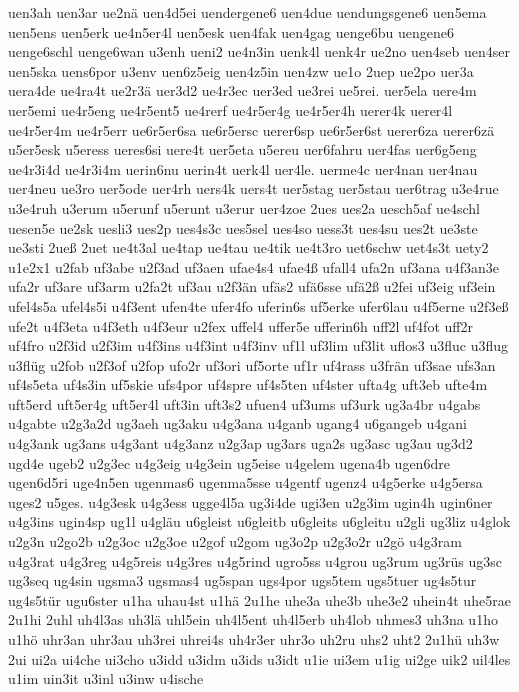{uen3ah
uen3ar
ue2nä
uen4d5ei
uendergene6
uen4due
uendungsgene6
uen5ema
uen5ens
uen5erk
ue4n5er4l
uen5esk
uen4fak
uen4gag
uenge6bu
uengene6
uenge6schl
uenge6wan
u3enh
ueni2
ue4n3in
uenk4l
uenk4r
ue2no
uen4seb
uen4ser
uen5ska
uens6por
u3env
uen6z5eig
uen4z5in
uen4zw
ue1o
2uep
ue2po
uer3a
uera4de
ue4ra4t
ue2r3ä
uer3d2
ue4r3ec
uer3ed
ue3rei
ue5rei.
uer5ela
uere4m
uer5emi
ue4r5eng
ue4r5ent5
ue4rerf
ue4r5er4g
ue4r5er4h
uerer4k
uerer4l
ue4r5er4m
ue4r5err
ue6r5er6sa
ue6r5ersc
uerer6sp
ue6r5er6st
uerer6za
uerer6zä
u5er5esk
u5eress
ueres6si
uere4t
uer5eta
u5ereu
uer6fahru
uer4fas
uer6g5eng
ue4r3i4d
ue4r3i4m
uerin6nu
uerin4t
uerk4l
uer4le.
uerme4c
uer4nan
uer4nau
uer4neu
ue3ro
uer5ode
uer4rh
uers4k
uers4t
uer5stag
uer5stau
uer6trag
u3e4rue
u3e4ruh
u3erum
u5erunf
u5erunt
u3erur
uer4zoe
2ues
ues2a
uesch5af
ue4schl
uesen5e
ue2sk
uesli3
ues2p
ues4s3c
ues5sel
ues4so
uess3t
ues4su
ues2t
ue3ste
ue3sti
2ueß
2uet
ue4t3al
ue4tap
ue4tau
ue4tik
ue4t3ro
uet6schw
uet4s3t
uety2
u1e2x1
u2fab
uf3abe
u2f3ad
uf3aen
ufae4s4
ufae4ß
ufall4
ufa2n
uf3ana
u4f3an3e
ufa2r
uf3are
uf3arm
u2fa2t
uf3au
u2f3än
ufäs2
ufä6sse
ufä2ß
u2fei
uf3eig
uf3ein
ufel4s5a
ufel4s5i
u4f3ent
ufen4te
ufer4fo
uferin6s
uf5erke
ufer6lau
u4f5erne
u2f3eß
ufe2t
u4f3eta
u4f3eth
u4f3eur
u2fex
uffel4
uffer5e
ufferin6h
uff2l
uf4fot
uff2r
uf4fro
u2f3id
u2f3im
u4f3ins
u4f3int
u4f3inv
uf1l
uf3lim
uf3lit
uflos3
u3fluc
u3flug
u3flüg
u2fob
u2f3of
u2fop
ufo2r
uf3ori
uf5orte
uf1r
uf4rass
u3frän
uf3sae
ufs3an
uf4s5eta
uf4s3in
uf5skie
ufs4por
uf4spre
uf4s5ten
uf4ster
ufta4g
uft3eb
ufte4m
uft5erd
uft5er4g
uft5er4l
uft3in
uft3s2
ufuen4
uf3ums
uf3urk
ug3a4br
u4gabs
u4gabte
u2g3a2d
ug3aeh
ug3aku
u4g3ana
u4ganb
ugang4
u6gangeb
u4gani
u4g3ank
ug3ans
u4g3ant
u4g3anz
u2g3ap
ug3ars
uga2s
ug3asc
ug3au
ug3d2
ugd4e
ugeb2
u2g3ec
u4g3eig
u4g3ein
ug5eise
u4gelem
ugena4b
ugen6dre
ugen6d5ri
uge4n5en
ugenmas6
ugenma5sse
u4gentf
ugenz4
u4g5erke
u4g5ersa
uges2
u5ges.
u4g3esk
u4g3ess
ugge4l5a
ug3i4de
ugi3en
u2g3im
ugin4h
ugin6ner
u4g3ins
ugin4sp
ug1l
u4gläu
u6gleist
u6gleitb
u6gleits
u6gleitu
u2gli
ug3liz
u4glok
u2g3n
u2go2b
u2g3oc
u2g3oe
u2gof
u2gom
ug3o2p
u2g3o2r
u2gö
u4g3ram
u4g3rat
u4g3reg
u4g5reis
u4g3res
u4g5rind
ugro5ss
u4grou
ug3rum
ug3rüs
ug3sc
ug3seq
ug4sin
ugsma3
ugsmas4
ug5span
ugs4por
ugs5tem
ugs5tuer
ug4s5tur
ug4s5tür
ugu6ster
u1ha
uhau4st
u1hä
2u1he
uhe3a
uhe3b
uhe3e2
uhein4t
uhe5rae
2u1hi
2uhl
uh4l3as
uh3lä
uhl5ein
uh4l5ent
uh4l5erb
uh4lob
uhmes3
uh3na
u1ho
u1hö
uhr3an
uhr3au
uh3rei
uhrei4s
uh4r3er
uhr3o
uh2ru
uhs2
uht2
2u1hü
uh3w
2ui
ui2a
ui4che
ui3cho
u3idd
u3idm
u3ids
u3idt
u1ie
ui3em
u1ig
ui2ge
uik2
uil4les
u1im
uin3it
u3inl
u3inw
u4ische
}
